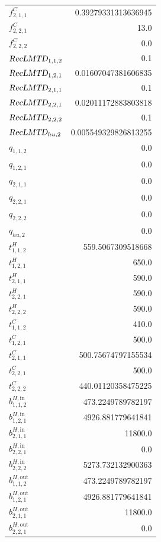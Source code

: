 \documentclass{article}%
\begin{document}
\begin{multicols*}{3}
\begin{supertabular}{lr}
	$f_{2,1,1}^{C}$ & 0.39279331313636945 \\%
	$f_{2,2,1}^{C}$ & 13.0 \\%
	$f_{2,2,2}^{C}$ & 0.0 \\%
	$\textsl{RecLMTD}_{1,1,2}$ & 0.1 \\%
	$\textsl{RecLMTD}_{1,2,1}$ & 0.01607047381606835 \\%
	$\textsl{RecLMTD}_{2,1,1}$ & 0.1 \\%
	$\textsl{RecLMTD}_{2,2,1}$ & 0.02011172883803818 \\%
	$\textsl{RecLMTD}_{2,2,2}$ & 0.1 \\%
	$\textsl{RecLMTD}_{hu,2}$ & 0.005549329826813255 \\%
	$q_{1,1,2}$ & 0.0 \\%
	$q_{1,2,1}$ & 0.0 \\%
	$q_{2,1,1}$ & 0.0 \\%
	$q_{2,2,1}$ & 0.0 \\%
	$q_{2,2,2}$ & 0.0 \\%
	$q_{hu,2}$ & 0.0 \\%
	$t_{1,1,2}^{H}$ & 559.5067309518668 \\%
	$t_{1,2,1}^{H}$ & 650.0 \\%
	$t_{2,1,1}^{H}$ & 590.0 \\%
	$t_{2,2,1}^{H}$ & 590.0 \\%
	$t_{2,2,2}^{H}$ & 590.0 \\%
	$t_{1,1,2}^{C}$ & 410.0 \\%
	$t_{1,2,1}^{C}$ & 500.0 \\%
	$t_{2,1,1}^{C}$ & 500.75674797155534 \\%
	$t_{2,2,1}^{C}$ & 500.0 \\%
	$t_{2,2,2}^{C}$ & 440.01120358475225 \\%
	$b_{1,1,2}^{H,\text{in}}$ & 473.2249789782197 \\%
	$b_{1,2,1}^{H,\text{in}}$ & 4926.881779641841 \\%
	$b_{2,1,1}^{H,\text{in}}$ & 11800.0 \\%
	$b_{2,2,1}^{H,\text{in}}$ & 0.0 \\%
	$b_{2,2,2}^{H,\text{in}}$ & 5273.732132900363 \\%
	$b_{1,1,2}^{H,\text{out}}$ & 473.2249789782197 \\%
	$b_{1,2,1}^{H,\text{out}}$ & 4926.881779641841 \\%
	$b_{2,1,1}^{H,\text{out}}$ & 11800.0 \\%
	$b_{2,2,1}^{H,\text{out}}$ & 0.0 \\%

\end{supertabular}
\end{multicols*}
\end{document}
